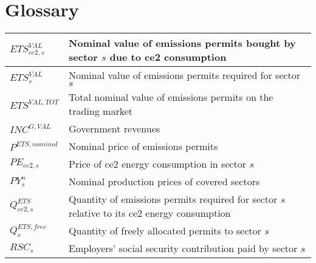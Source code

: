 \documentclass[12pt]{article}
\numberwithin{equation}{section}
\begin{document}
        \section{Glossary}
        \normalsize
        \begin{longtable}{@{}p{4cm}p{9cm}@{}} 
$ETS^{VAL}_{ce2, s}$ & Nominal value of emissions permits bought by sector $s$ due to ce2 consumption \\
 \midrule 
$ETS^{VAL}_{s}$ & Nominal value of emissions permits required for sector $s$ \\
 \midrule 
$ETS^{VAL,TOT}$ & Total nominal value of emissions permits on the trading market \\
 \midrule 
$INC^{G,VAL}$ & Government revenues \\
 \midrule 
$P^{ETS,nominal}$ & Nominal price of emissions permits \\
 \midrule 
$PE_{ce2, s}$ & Price of ce2 energy consumption in sector $s$ \\
 \midrule 
$PY^{n}_{s}$ & Nominal production prices of covered sectors \\
 \midrule 
$Q^{ETS}_{ce2, s}$ & Quantity of emissions permits required for sector $s$ relative to its ce2 energy consumption \\
 \midrule 
$Q^{ETS,free}_{s}$ & Quantity of freely allocated permits to sector $s$ \\
 \midrule 
$RSC_{s}$ & Employers' social security contribution paid by sector $s$ \\
\end{longtable}
\end{document}
